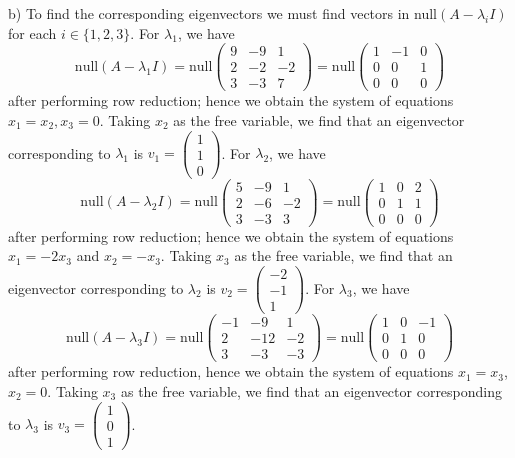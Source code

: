 \documentclass[12pt]{article}
\renewcommand{\=}[1]{\stackrel{#1}{=}} %
\theoremstyle{definition}
\begin{document}
b) To find the corresponding eigenvectors we must find vectors in null$(A - \lambda_i I)$ for each $i \in  \{1, 2, 3\}$. For $\lambda_1$, we have $$\text{null}(A - \lambda_1I) = \text{null}\begin{pmatrix}
    9 & -9 & 1\\
    2 & -2 & -2\\
    3 & -3 & 7
\end{pmatrix} = \text{null}\begin{pmatrix}
    1 & -1 & 0\\
    0 & 0 & 1\\
    0 & 0 & 0
    \end{pmatrix}$$ after performing row reduction; hence we obtain the system of equations $x_1 = x_2, x_3 = 0$. Taking $x_2$ as the free variable, we find that an eigenvector corresponding to $\lambda_1$ is $v_1 = \begin{pmatrix}
        1 \\ 1 \\ 0
    \end{pmatrix}$. For $\lambda_2$, we have $$\text{null}(A - \lambda_2I) = \text{null}\begin{pmatrix}
    5 & -9 & 1\\
    2 & -6 & -2\\
    3 & -3 & 3
\end{pmatrix} = \text{null}\begin{pmatrix}
    1 & 0 & 2\\
    0 & 1 & 1\\
    0 & 0 & 0
    \end{pmatrix}$$ after performing row reduction; hence we obtain the system of equations $x_1 = -2x_3$ and $x_2 = -x_3$. Taking $x_3$ as the free variable, we find that an eigenvector corresponding to $\lambda_2$ is $v_2 = \begin{pmatrix}
        -2 \\ -1 \\ 1
    \end{pmatrix}$. For $\lambda_3$, we have $$\text{null}(A - \lambda_3I) = \text{null}\begin{pmatrix}
    -1 & -9 & 1\\
    2 & -12 & -2\\
    3 & -3 & -3
\end{pmatrix} = \text{null}\begin{pmatrix}
    1 & 0 & -1\\
    0 & 1 & 0\\
    0 & 0 & 0
\end{pmatrix}$$ after performing row reduction, hence we obtain the system of equations $x_1 = x_3$, $x_2 = 0$. Taking $x_3$ as the free variable, we find that an eigenvector corresponding to $\lambda_3$ is $v_3 = \begin{pmatrix}
        1 \\ 0 \\ 1
    \end{pmatrix}$.
\end{document}
